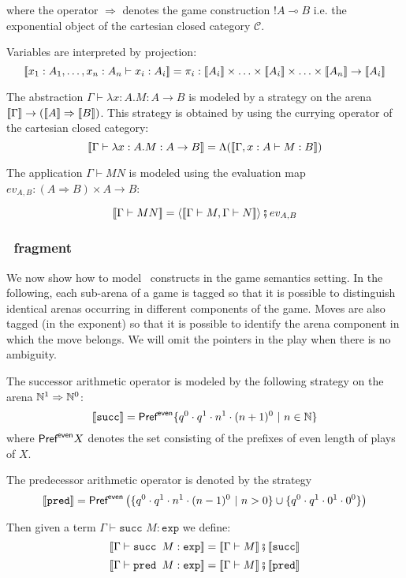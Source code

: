 where the operator $\Rightarrow$ denotes the game construction $!A
\multimap B$ i.e. the exponential object of the cartesian closed
category $\mathcal{C}$.



Variables are interpreted by projection:
$$\sem{x_1 : A_1, \ldots, x_n:A_n \vdash x_i : A_i} = \pi_i : \sem{A_i} \times \ldots \times \sem{A_i} \times \ldots \times \sem{A_n} \rightarrow  \sem{A_i}$$

The abstraction $\Gamma \vdash \lambda x :A.M : A \rightarrow B$ is
modeled by a strategy on the arena ${[\![ \Gamma ]\!]} \rightarrow
({[\![ A ]\!]}\Rightarrow{[\![B ]\!]})$. This strategy is obtained by using the
currying operator of the cartesian closed category:
$${[\![ \Gamma \vdash \lambda x :A.M : A \rightarrow B ]\!]} = \Lambda( {[\![ \Gamma, x :A \vdash M : B ]\!]})$$

The application $\Gamma \vdash M N$ is modeled using the evaluation
map $ev_{A,B} : (A\Rightarrow B)\times A \rightarrow B$:

$${[\![ \Gamma \vdash M N ]\!]} = \langle {[\![\Gamma \vdash M, \Gamma \vdash N ]\!]} \rangle \fatsemi ev_{A,B}$$


\subsubsection{\pcf\ fragment}

We now show how to model \pcf\ constructs in the game semantics
setting. In the following, each sub-arena of a game is tagged so that it is possible to distinguish identical arenas
occurring in different components of the game. Moves are also tagged (in the exponent) so that it is possible
to identify the arena component in which the move belongs. We will
omit the pointers in the play when there is no ambiguity.

The successor arithmetic operator is modeled by the following
strategy on the arena $\mathbb{N}^1 \Rightarrow \mathbb{N}^0$:
$${[\![ \texttt{succ} ]\!]} = \textsf{Pref}^{\sf even} \{q^0 \cdot q^1 \cdot n^1 \cdot (n+1)^0\ |\ n \in \mathbb{N} \}$$
where $\textsf{Pref}^{\sf even} X$ denotes the set consisting of the prefixes of even length of plays of $X$. 

The predecessor arithmetic operator is denoted by the strategy
$${[\![ \texttt{pred} ]\!]} = \textsf{Pref}^{\sf even} \left( \{q^0 \cdot q^1 \cdot n^1 \cdot (n-1)^0\ |\ n >0 \} \cup \{ q^0 \cdot q^1 \cdot 0^1 \cdot 0^0 \} \right)$$

Then given a term $\Gamma \vdash \texttt{succ }M : \texttt{exp}$ we
define:
$${[\![ \Gamma \vdash \texttt{succ } M : \texttt{exp} ]\!]} = {[\![ \Gamma \vdash M ]\!]} \fatsemi {[\![\texttt{succ} ]\!]} $$
$${[\![ \Gamma \vdash \texttt{pred } M : \texttt{exp} ]\!]} = {[\![ \Gamma \vdash M ]\!]} \fatsemi {[\![\texttt{pred} ]\!]} $$

